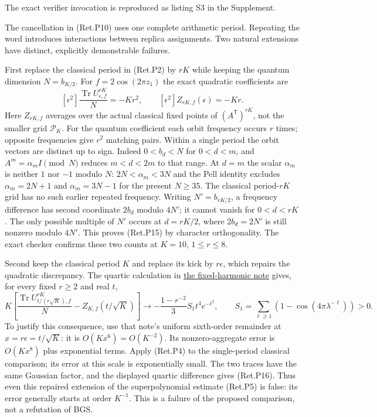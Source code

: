 The exact verifier invocation is reproduced as listing S3 in the Supplement.

The cancellation in (Ret.P10) uses one complete arithmetic period.
Repeating the word introduces interactions between replica assignments.
Two natural extensions have distinct, explicitly demonstrable failures.

First replace the classical period in (Ret.P2) by \(rK\) while keeping the
quantum dimension \(N=b_{K/2}\). For \(f=2\cos(2\pi z_1)\) the exact
quadratic coefficients are
\[
 [\epsilon^2]\frac{\operatorname{Tr}U_{\epsilon,f}^{rK}}N
        =-Kr^2,\qquad
 [\epsilon^2]Z_{rK,f}(\epsilon)=-Kr.                         \tag{Ret.P15}
\]
Here \(Z_{rK,f}\) averages over the actual classical fixed points of
\((A^{\mathsf T})^{rK}\), not the smaller grid \(\mathcal P_K\).
For the quantum coefficient each orbit frequency occurs \(r\) times;
opposite frequencies give \(r^2\) matching pairs.
Within a single period the orbit vectors are distinct up to sign.
Indeed \(0<b_d<N\) for \(0<d<m\), and
\(A^m=\alpha_mI\pmod N\) reduces \(m<d<2m\) to that range.
At \(d=m\) the scalar \(\alpha_m\) is neither \(1\) nor \(-1\) modulo \(N\):
\(2N<\alpha_m<3N\) and the Pell identity excludes
\(\alpha_m=2N+1\) and \(\alpha_m=3N-1\) for the present \(N\ge35\).
The classical period-\(rK\) grid has no such earlier repeated frequency.
Writing \(N'=b_{rK/2}\), a frequency difference has second coordinate
\(2b_d\) modulo \(4N'\); it cannot vanish for \(0<d<rK\).
The only possible multiple of \(N'\) occurs at \(d=rK/2\), where
\(2b_d=2N'\) is still nonzero modulo \(4N'\).
This proves (Ret.P15) by character orthogonality.
The exact checker confirms these two counts at \(K=10\), \(1\le r\le8\).

Second keep the classical period \(K\) and replace its kick by \(r\epsilon\),
which repairs the quadratic discrepancy. The quartic calculation in
\href{https://github.com/ChurilovMaksim/BGS/blob/main/mathematics/returns/fixed_harmonic_return_gas.md}{the fixed-harmonic note} gives, for every
fixed \(r\ge2\) and real \(t\),
\[
 K\left[
 \frac{\operatorname{Tr}U_{t/(r\sqrt K),f}^{rK}}N
                  -Z_{K,f}(t/\sqrt K)\right]
 \longrightarrow
 -\frac{1-r^{-2}}3 S_1t^4e^{-t^2},\qquad
 S_1=\sum_{\ell\ge1}(1-\cos(4\pi\lambda^{-\ell}))>0.         \tag{Ret.P16}
\]
To justify this consequence, use that note's uniform sixth-order
remainder at \(x=r\epsilon=t/\sqrt K\): it is \(O(Kx^6)=O(K^{-2})\).
Its nonzero-aggregate error is \(O(Kx^8)\) plus exponential terms.
Apply (Ret.P4) to the single-period classical comparison; its error at this
scale is exponentially small. The two traces have the same Gaussian
factor, and the displayed quartic difference gives (Ret.P16).
Thus even this repaired extension of the superpolynomial estimate
(Ret.P5) is false: its error generally starts at order \(K^{-1}\).
This is a failure of the proposed comparison, not a refutation of BGS.

